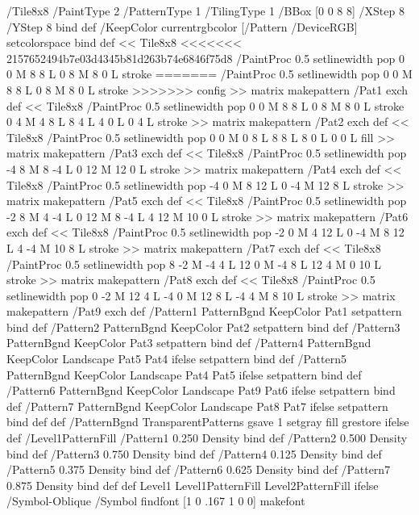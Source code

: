 {{{{{{/Tile8x8 {/PaintType 2 /PatternType 1 /TilingType 1 /BBox [0 0 8 8] /XStep 8 /YStep 8}
	bind def
/KeepColor {currentrgbcolor [/Pattern /DeviceRGB] setcolorspace} bind def
<< Tile8x8
<<<<<<< 2157652494b7e03d4345b81d263b74e6846f75d8
 /PaintProc {0.5 setlinewidth pop 0 0 M 8 8 L 0 8 M 8 0 L stroke} 
=======
 /PaintProc {0.5 setlinewidth pop 0 0 M 8 8 L 0 8 M 8 0 L stroke}
>>>>>>> config
>> matrix makepattern
/Pat1 exch def
<< Tile8x8
 /PaintProc {0.5 setlinewidth pop 0 0 M 8 8 L 0 8 M 8 0 L stroke
	0 4 M 4 8 L 8 4 L 4 0 L 0 4 L stroke}
>> matrix makepattern
/Pat2 exch def
<< Tile8x8
 /PaintProc {0.5 setlinewidth pop 0 0 M 0 8 L
	8 8 L 8 0 L 0 0 L fill}
>> matrix makepattern
/Pat3 exch def
<< Tile8x8
 /PaintProc {0.5 setlinewidth pop -4 8 M 8 -4 L
	0 12 M 12 0 L stroke}
>> matrix makepattern
/Pat4 exch def
<< Tile8x8
 /PaintProc {0.5 setlinewidth pop -4 0 M 8 12 L
	0 -4 M 12 8 L stroke}
>> matrix makepattern
/Pat5 exch def
<< Tile8x8
 /PaintProc {0.5 setlinewidth pop -2 8 M 4 -4 L
	0 12 M 8 -4 L 4 12 M 10 0 L stroke}
>> matrix makepattern
/Pat6 exch def
<< Tile8x8
 /PaintProc {0.5 setlinewidth pop -2 0 M 4 12 L
	0 -4 M 8 12 L 4 -4 M 10 8 L stroke}
>> matrix makepattern
/Pat7 exch def
<< Tile8x8
 /PaintProc {0.5 setlinewidth pop 8 -2 M -4 4 L
	12 0 M -4 8 L 12 4 M 0 10 L stroke}
>> matrix makepattern
/Pat8 exch def
<< Tile8x8
 /PaintProc {0.5 setlinewidth pop 0 -2 M 12 4 L
	-4 0 M 12 8 L -4 4 M 8 10 L stroke}
>> matrix makepattern
/Pat9 exch def
/Pattern1 {PatternBgnd KeepColor Pat1 setpattern} bind def
/Pattern2 {PatternBgnd KeepColor Pat2 setpattern} bind def
/Pattern3 {PatternBgnd KeepColor Pat3 setpattern} bind def
/Pattern4 {PatternBgnd KeepColor Landscape {Pat5} {Pat4} ifelse setpattern} bind def
/Pattern5 {PatternBgnd KeepColor Landscape {Pat4} {Pat5} ifelse setpattern} bind def
/Pattern6 {PatternBgnd KeepColor Landscape {Pat9} {Pat6} ifelse setpattern} bind def
/Pattern7 {PatternBgnd KeepColor Landscape {Pat8} {Pat7} ifelse setpattern} bind def
} def
%
%
%
/PatternBgnd {
  TransparentPatterns {} {gsave 1 setgray fill grestore} ifelse
} def
%
%
/Level1PatternFill {
/Pattern1 {0.250 Density} bind def
/Pattern2 {0.500 Density} bind def
/Pattern3 {0.750 Density} bind def
/Pattern4 {0.125 Density} bind def
/Pattern5 {0.375 Density} bind def
/Pattern6 {0.625 Density} bind def
/Pattern7 {0.875 Density} bind def
} def
%
%
Level1 {Level1PatternFill} {Level2PatternFill} ifelse
%
/Symbol-Oblique /Symbol findfont [1 0 .167 1 0 0] makefont
}}}}}
